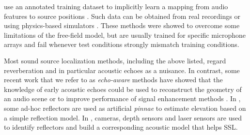  use an annotated training dataset to implicitly
learn a mapping from audio features to source positions
\cite{deleforge2015acoustic, Vesperini2016, Adavanne2017,  Perotin2018, gaultier2017vast}.
Such data can be obtained from real recordings \cite{deleforge2015acoustic} or
using physics-based simulators \cite{Vesperini2016, Adavanne2017,  Perotin2018, gaultier2017vast}.
These methods were showed to overcome some limitations of the free-field model,
but are usually trained for specific microphone arrays and fail whenever test conditions strongly mismatch training conditions.

Most sound source localization methods, including the above listed,
regard reverberation and in particular acoustic echoes as a nuisance.
In contrast, some recent work that we refer to as \textit{echo-aware}
methods have showed that the knowledge of early acoustic echoes could
be used to reconstruct the geometry of an audio scene \cite{Nakashima2010,dokmanic2013acoustic,An2018}
or to improve performance of signal enhancement methods \cite{flanagan1993spatially, dokmanic2015raking,Scheibler2017}.
In \cite{Nakashima2010}, some ad-hoc reflectors are used as artificial \textit{pinnae}
to estimate elevation based on a simple reflection model.
In \cite{An2018}, cameras, depth sensors and laser sensors are used to
identify reflectors and build a corresponding acoustic model that helps SSL.

